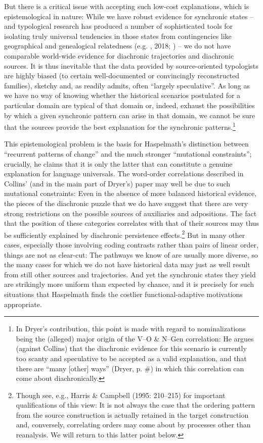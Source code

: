 \documentclass[output=paper]{langsci/langscibook}
\begin{document}
But there is a critical issue with accepting such low-cost explanations, which is epistemological in nature: While we have robust evidence for synchronic states – and typological research has produced a number of sophisticated tools for isolating truly universal tendencies in those states from contingencies like geographical and genealogical relatedness (e.g. \citealt{Bickel2013}, 2018; \citealt{JaegerEtAl2011}) – we do not have comparable world-wide evidence for diachronic trajectories and diachronic sources. It is thus inevitable that the data provided by source-oriented typologists are highly biased (to certain well-documented or convincingly reconstructed families), sketchy and, as \citet[3]{Creissels2008} readily admits, often “largely speculative”. As long as we have no way of knowing whether the historical scenarios postulated for a particular domain are typical of that domain or, indeed, exhaust the possibilities by which a given synchronic pattern can arise in that domain, we cannot be sure that the sources provide the best explanation for the synchronic patterns.\footnote{In Dryer’s contribution, this point is made with regard to nominalizations being the (alleged) major origin of the V–O \& N–Gen correlation: He argues (against Collins) that the diachronic evidence for this scenario is currently too scanty and speculative to be accepted as a valid explanation, and that there are “many [other] ways” (Dryer, p. \#) in which this correlation can come about diachronically.} 

This epistemological problem is the basis for Haspelmath’s distinction between “recurrent patterns of change” and the much stronger “mutational constraints”; crucially, he claims that it is only the latter that can constitute a genuine explanation for language universals. The word-order correlations described in Collins’ (and in the main part of Dryer’s) paper may well be due to such mutational constraints: Even in the absence of more balanced historical evidence, the pieces of the diachronic puzzle that we do have suggest that there are very strong restrictions on the possible sources of auxiliaries and adpositions. The fact that the position of these categories correlates with that of their sources may thus be sufficiently explained by diachronic persistence effects.\footnote{Though see, e.g., Harris \& Campbell (1995: 210–215) for important qualifications of this view: It is not always the case that the ordering pattern from the source construction is actually retained in the target construction and, conversely, correlating orders may come about by processes other than reanalysis. We will return to this latter point below.} But in many other cases, especially those involving coding contrasts rather than pairs of linear order, things are not as clear-cut: The pathways we know of are usually more diverse, so the many cases for which we do not have historical data may just as well result from still other sources and trajectories. And yet the synchronic states they yield are strikingly more uniform than expected by chance, and it is precisely for such situations that Haspelmath finds the costlier functional-adaptive motivations appropriate.
\end{document}
